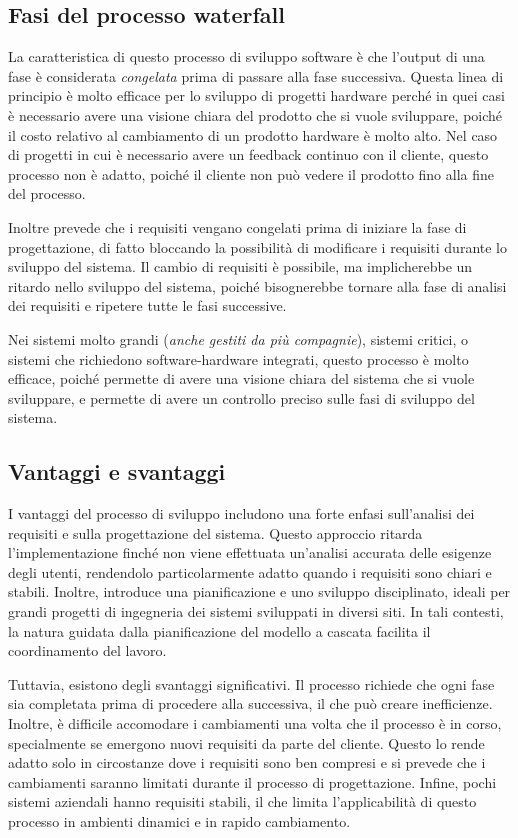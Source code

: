 \subsection{Fasi del processo waterfall}
La caratteristica di questo processo di sviluppo software è che l'output di una 
fase è considerata \textit{congelata} prima di passare alla fase successiva. 
Questa linea di principio è molto efficace per lo sviluppo di progetti hardware perché 
in quei casi è necessario avere una visione chiara del prodotto che si vuole sviluppare,
poiché il costo relativo al cambiamento di un prodotto hardware è molto alto.
Nel caso di progetti in cui è necessario avere un feedback continuo con il cliente,
questo processo non è adatto, poiché il cliente non può vedere il prodotto fino alla
fine del processo.

Inoltre prevede che i requisiti vengano congelati prima di iniziare la fase di progettazione,
di fatto bloccando la possibilità di modificare i requisiti durante lo sviluppo del sistema.
Il cambio di requisiti è possibile, ma implicherebbe un ritardo nello sviluppo del sistema,
poiché bisognerebbe tornare alla fase di analisi dei requisiti e ripetere tutte le fasi
successive.

Nei sistemi molto grandi (\textit{anche gestiti da più compagnie}), sistemi critici,
o sistemi che richiedono software-hardware integrati, questo processo
è molto efficace, poiché permette di avere una visione chiara del sistema che si vuole
sviluppare, e permette di avere un controllo preciso sulle fasi di sviluppo del sistema.
\subsection{Vantaggi e svantaggi}
I vantaggi del processo di sviluppo includono una forte enfasi sull'analisi dei
requisiti e sulla progettazione del sistema. Questo approccio ritarda l'implementazione
finché non viene effettuata un'analisi accurata delle esigenze degli utenti, rendendolo
particolarmente adatto quando i requisiti sono chiari e stabili. Inoltre, introduce una
pianificazione e uno sviluppo disciplinato, ideali per grandi progetti di ingegneria dei
sistemi sviluppati in diversi siti. In tali contesti, la natura guidata dalla
pianificazione del modello a cascata facilita il coordinamento del lavoro.

Tuttavia, esistono degli svantaggi significativi. Il processo richiede che ogni fase
sia completata prima di procedere alla successiva, il che può creare inefficienze.
Inoltre, è difficile accomodare i cambiamenti una volta che il processo è in corso,
specialmente se emergono nuovi requisiti da parte del cliente. Questo lo rende adatto
solo in circostanze dove i requisiti sono ben compresi e si prevede che i cambiamenti
saranno limitati durante il processo di progettazione. Infine, pochi sistemi aziendali
hanno requisiti stabili, il che limita l'applicabilità di questo processo in ambienti
dinamici e in rapido cambiamento.


